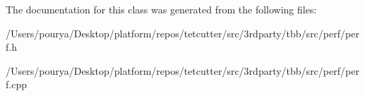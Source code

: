 The documentation for this class was generated from the following files\+:\begin{DoxyCompactItemize}
\item 
/\+Users/pourya/\+Desktop/platform/repos/tetcutter/src/3rdparty/tbb/src/perf/perf.\+h\item 
/\+Users/pourya/\+Desktop/platform/repos/tetcutter/src/3rdparty/tbb/src/perf/perf.\+cpp\end{DoxyCompactItemize}
